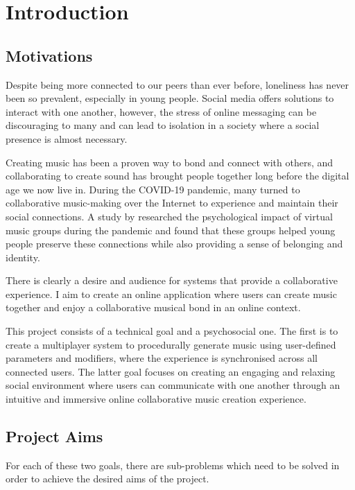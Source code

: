 \chapter{Introduction}



\section{Motivations}

Despite being more connected to our peers than ever before, loneliness has never been so prevalent, especially in young people. Social media offers solutions to interact with one another, however, the stress of online messaging can be discouraging to many and can lead to isolation in a society where a social presence is almost necessary.

Creating music has been a proven way to bond and connect with others, and collaborating to create sound has brought people together long before the digital age we now live in. During the COVID-19 pandemic, many turned to collaborative music-making over the Internet to experience and maintain their social connections. A study by \cite{levstek2021all} researched the psychological impact of virtual music groups during the pandemic and found that these groups helped young people preserve these connections while also providing a sense of belonging and identity.

There is clearly a desire and audience for systems that provide a collaborative experience. I aim to create an online application where users can create music together and enjoy a collaborative musical bond in an online context.

This project consists of a technical goal and a psychosocial one. The first is to create a multiplayer system to procedurally generate music using user-defined parameters and modifiers, where the experience is synchronised across all connected users. The latter goal focuses on creating an engaging and relaxing social environment where users can communicate with one another through an intuitive and immersive online collaborative music creation experience.



\section{Project Aims}

For each of these two goals, there are sub-problems which need to be solved in order to achieve the desired aims of the project.

